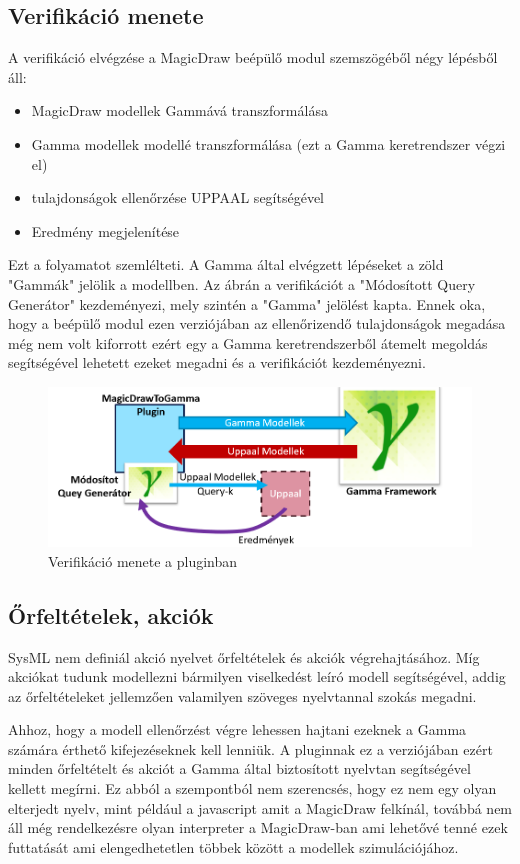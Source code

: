 \subsection{Verifikáció menete}

A verifikáció elvégzése a MagicDraw beépülő modul szemszögéből négy lépésből áll: 
\begin{itemize}
	\item MagicDraw modellek Gammává transzformálása
	\item Gamma modellek \uppaal modellé transzformálása (ezt a Gamma keretrendszer végzi el)
	\item tulajdonságok ellenőrzése UPPAAL segítségével
	\item Eredmény megjelenítése
\end{itemize}
Ezt a folyamatot  szemlélteti. A Gamma által elvégzett lépéseket a zöld "Gammák" jelölik a modellben. Az ábrán a verifikációt a "Módosított Query Generátor" kezdeményezi, mely szintén a "Gamma" jelölést kapta. Ennek oka, hogy a beépülő modul ezen verziójában az ellenőrizendő tulajdonságok megadása még nem volt kiforrott ezért egy a Gamma keretrendszerből átemelt megoldás segítségével lehetett ezeket megadni és a verifikációt kezdeményezni. 

\begin{figure}[!ht]
	\centering
	\includegraphics[width=150mm, keepaspectratio]{figures/preliminaries/concept.png}
	\caption{Verifikáció menete a pluginban}
	\label{fig:preliminaries-verif}
\end{figure}

\subsection{Őrfeltételek, akciók}

SysML nem definiál akció nyelvet őrfeltételek és akciók végrehajtásához. Míg akciókat tudunk modellezni bármilyen viselkedést leíró modell segítségével, addig az őrfeltételeket jellemzően valamilyen szöveges nyelvtannal szokás megadni.

Ahhoz, hogy a modell ellenőrzést végre lehessen hajtani ezeknek a Gamma számára érthető kifejezéseknek kell lenniük. A pluginnak ez a verziójában ezért minden őrfeltételt és akciót a Gamma által biztosított nyelvtan segítségével kellett megírni. Ez abból a szempontból nem szerencsés, hogy ez nem egy olyan elterjedt nyelv, mint például a javascript amit a MagicDraw felkínál, továbbá nem áll még rendelkezésre olyan interpreter a MagicDraw-ban ami lehetővé tenné ezek futtatását ami elengedhetetlen többek között a modellek szimulációjához.



